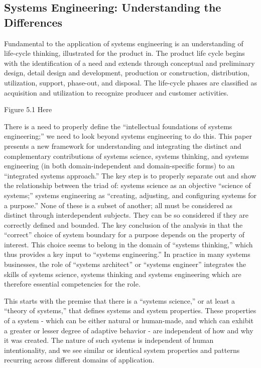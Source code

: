\subsection{Systems Engineering: Understanding the Differences}

Fundamental to the application of systems engineering is an understanding of life-cycle thinking, illustrated for the product in. The product life cycle begins with the identification of a need and extends through conceptual and preliminary design, detail design and development, production or construction, distribution, utilization, support, phase-out, and disposal. The life-cycle phases are classified as acquisition and utilization to recognize producer and customer activities.

Figure 5.1 Here

There is a need to properly define the ``intellectual foundations of systems engineering;'' we need to look beyond systems engineering to do this. This paper presents a new framework for understanding and integrating the distinct and complementary contributions of systems science, systems thinking, and systems engineering (in both domain-independent and domain-specific forms) to an ``integrated systems approach.'' The key step is to properly separate out and show the relationship between the triad of: systems science as an objective ``science of systems;'' systems engineering as ``creating, adjusting, and configuring systems for a purpose.'' None of these is a subset of another; all must be considered as distinct through interdependent subjects. They can be so considered if they are correctly defined and bounded. The key conclusion of the analysis in that the ``correct'' choice of system boundary for a purpose depends on the property of interest. This choice seems to belong in the domain of ``systems thinking,'' which thus provides a key input to ``systems engineering.'' In practice in many systems businesses, the role of “systems architect” or ``systems engineer'' integrates the skills of systems science, systems thinking and systems engineering which are therefore essential competencies for the role.

This starts with the premise that there is a ``systems science,'' or at least a ``theory of systems,'' that defines systems and system properties. These properties of a system - which can be either natural or human-made, and which can exhibit a greater or lesser degree of adaptive behavior - are independent of how and why it was created. The nature of such systems is independent of human intentionality, and we see similar or identical system properties and patterns recurring across different domains of application.


